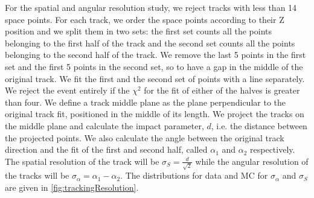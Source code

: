For the spatial and angular resolution study, we reject tracks with less than 14 space points. For each track, we order the space points according to their Z position and we split them in two sets: the first set counts all the points belonging to the first half of the track and the second set counts all the points belonging to the second half of the track. We remove the last 5 points in the first set and the first 5 points in the second set, so to have a gap in the middle of the original track. We fit the first and the second set of points with a line separately. We reject the event entirely if the  $\chi^2$ for the fit of either of the halves is greater than four.  We define a track middle plane as the plane perpendicular to the original track fit, positioned in the middle of its length. We project the tracks on the middle plane and calculate the impact parameter, $d$, i.e. the distance between the projected points. We also calculate the angle between the original track direction and the fit of the first and second half, called $\alpha_1$ and $\alpha_2$ respectively. The spatial resolution of the track will be $\sigma_S = \frac{d}{\sqrt 2}$ while the angular resolution of the tracks will be  $\sigma_\alpha = \alpha_1 - \alpha_2$. The distributions for data and MC for $\sigma_\alpha$ and $\sigma_S$ are given in \ref{fig:trackingResolution}.









